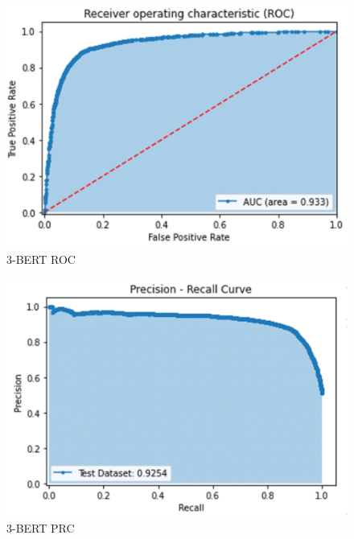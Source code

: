 \documentclass{article}
\begin{document}
\begin{figure}[htb]
  \centering
  \includegraphics[width=\linewidth]{./3bertroc.png}
  \caption{3-BERT ROC}
  \label{fig:3bertroc}
\end{figure}

\begin{figure}[htb]
  \centering
  \includegraphics[width=\linewidth]{./3bertprc.png}
  \caption{3-BERT PRC}
  \label{fig:3bertprc}
\end{figure}
\end{document}
